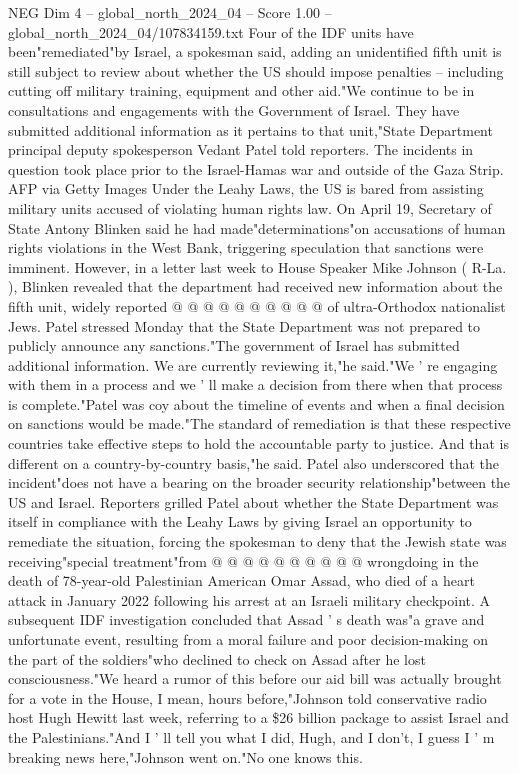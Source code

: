 \begin{textsample}{NEG Dim 4 – global\_north\_2024\_04 – Score 1.00 – global\_north\_2024\_04/107834159.txt}  \label{ex:f4_neg_092}
Four of the IDF units have been"remediated"by Israel, a spokesman said, adding an unidentified fifth unit is still subject to review about whether the US should impose penalties -- including cutting off military training, equipment and other aid."We continue to be in consultations and engagements with the Government of Israel.
They have submitted additional information as it pertains to that unit,"State Department principal deputy spokesperson Vedant Patel told reporters.
The incidents in question took place prior to the Israel-Hamas war and outside of the Gaza Strip.
AFP via Getty Images Under the Leahy Laws, the US is bared from assisting military units accused of violating human rights law.
On April 19, Secretary of State Antony Blinken said he had made"determinations"on accusations of human rights violations in the West Bank, triggering speculation that sanctions were imminent.
However, in a letter last week to House Speaker Mike Johnson ( R-La. ), Blinken revealed that the department had received new information about the fifth unit, widely reported @ @ @ @ @ @ @ @ @ @ of ultra-Orthodox nationalist Jews.
Patel stressed Monday that the State Department was not prepared to publicly announce any sanctions."The government of Israel has submitted additional information.
We are currently reviewing it,"he said."We ' re engaging with them in a process and we ' ll make a decision from there when that process is complete."Patel was coy about the timeline of events and when a final decision on sanctions would be made."The standard of remediation is that these respective countries take effective steps to hold the accountable party to justice.
And that is different on a country-by-country basis,"he said.
Patel also underscored that the incident"does not have a bearing on the broader security relationship"between the US and Israel.
Reporters grilled Patel about whether the State Department was itself in compliance with the Leahy Laws by giving Israel an opportunity to remediate the situation, forcing the spokesman to deny that the Jewish state was receiving"special treatment"from @ @ @ @ @ @ @ @ @ @ wrongdoing in the death of 78-year-old Palestinian American Omar Assad, who died of a heart attack in January 2022 following his arrest at an Israeli military checkpoint.
A subsequent IDF investigation concluded that Assad ' s death was"a grave and unfortunate event, resulting from a moral failure and poor decision-making on the part of the soldiers"who declined to check on Assad after he lost consciousness."We heard a rumor of this before our aid bill was actually brought for a vote in the House, I mean, hours before,"Johnson told conservative radio host Hugh Hewitt last week, referring to a \$26 billion package to assist Israel and the Palestinians."And I ' ll tell you what I did, Hugh, and I don't, I guess I ' m breaking news here,"Johnson went on."No one knows this.

\end{textsample}
